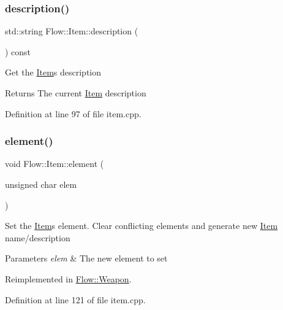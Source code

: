 \subsubsection{\texorpdfstring{description()}{description()}\hspace{0.1cm}{\footnotesize\ttfamily [2/2]}}
{\footnotesize\ttfamily std\+::string Flow\+::\+Item\+::description (\begin{DoxyParamCaption}{ }\end{DoxyParamCaption}) const}

Get the \hyperlink{class_flow_1_1_item}{Item}\textquotesingle{}s description \begin{DoxyReturn}{Returns}
The current \hyperlink{class_flow_1_1_item}{Item} description 
\end{DoxyReturn}


Definition at line 97 of file item.\+cpp.

\hypertarget{class_flow_1_1_item_a9a9f3132cecb67d6104668100f00cd47}{}\label{class_flow_1_1_item_a9a9f3132cecb67d6104668100f00cd47} 
\subsubsection{\texorpdfstring{element()}{element()}\hspace{0.1cm}{\footnotesize\ttfamily [1/2]}}
{\footnotesize\ttfamily void Flow\+::\+Item\+::element (\begin{DoxyParamCaption}\item[{unsigned char}]{elem }\end{DoxyParamCaption})\hspace{0.3cm}{\ttfamily [virtual]}}

Set the \hyperlink{class_flow_1_1_item}{Item}\textquotesingle{}s element. Clear conflicting elements and generate new \hyperlink{class_flow_1_1_item}{Item} name/description 
\begin{DoxyParams}{Parameters}
{\em elem} & The new element to set \\
\hline
\end{DoxyParams}


Reimplemented in \hyperlink{class_flow_1_1_weapon_a5e008e915610d3ba9d38fed417c807b8}{Flow\+::\+Weapon}.



Definition at line 121 of file item.\+cpp.

\hypertarget{class_flow_1_1_item_ae108f4ebbdcd75ac4d4ee1d009330040}{}\label{class_flow_1_1_item_ae108f4ebbdcd75ac4d4ee1d009330040} 
